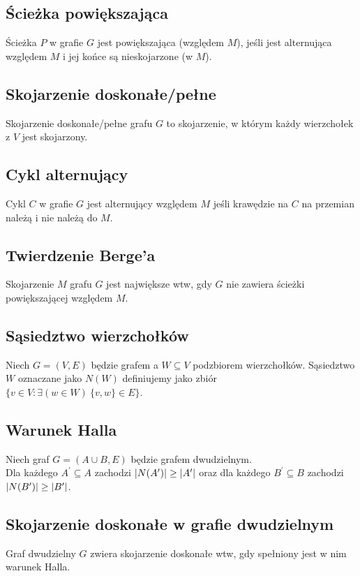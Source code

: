 \subsection*{Ścieżka powiększająca}
Ścieżka $P$ w grafie $G$ jest powiększająca (względem $M$), jeśli jest 
alternująca względem $M$ i jej końce są nieskojarzone (w $M$).

\subsection*{Skojarzenie doskonałe/pełne}
Skojarzenie doskonałe/pełne grafu $G$ to skojarzenie, w którym każdy
wierzchołek z $V$ jest skojarzony.

\subsection*{Cykl alternujący}
Cykl $C$ w grafie $G$ jest alternujący względem $M$ jeśli krawędzie na $C$
na przemian należą i nie należą do $M$.

\subsection*{Twierdzenie Berge'a}
Skojarzenie $M$ grafu $G$ jest największe wtw, gdy $G$ nie zawiera ścieżki
powiększającej względem $M$.

\subsection*{Sąsiedztwo wierzchołków}
Niech $G = (V, E)$ będzie grafem a $W \subseteq V$ podzbiorem wierzchołków.
Sąsiedztwo $W$ oznaczane jako $N(W)$ definiujemy jako zbiór \\
$\{ v \in V : \exists(w \in W) \ \{ v, w\} \in E \}$.

\subsection*{Warunek Halla}
Niech graf $G = (A \cup B, E)$ będzie grafem dwudzielnym. \\
Dla każdego $A^\prime \subseteq A$ zachodzi 
$\left| N(A^\prime) \right| \geq \left| A^\prime \right|$ oraz dla każdego $B^\prime \subseteq B$ 
zachodzi $\left| N(B^\prime) \right| \geq \left| B^\prime \right|$.

\subsection*{Skojarzenie doskonałe w grafie dwudzielnym}
Graf dwudzielny $G$ zwiera skojarzenie doskonałe wtw, gdy spełniony jest 
w nim warunek Halla. 

